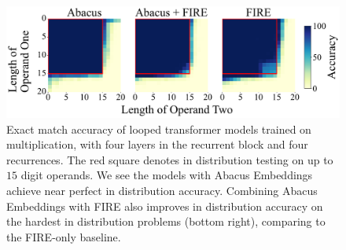 \documentclass{article}
\begin{document}
\begin{figure}[b!]
    \centering
    \includegraphics[width=\textwidth]{Figures/grids_plot_14_06.pdf}
    \caption{
    Exact match accuracy of looped transformer models trained on multiplication, with four layers in the recurrent block and four recurrences.
    The red square denotes in distribution testing on up to \(15\) digit operands.
    We see the models with Abacus Embeddings achieve near perfect in distribution accuracy.
    Combining Abacus Embeddings with FIRE also improves in distribution accuracy on the hardest in distribution problems (bottom right), comparing to the FIRE-only baseline.
    }
    \label{fig:mul}
\end{figure}
\end{document}
